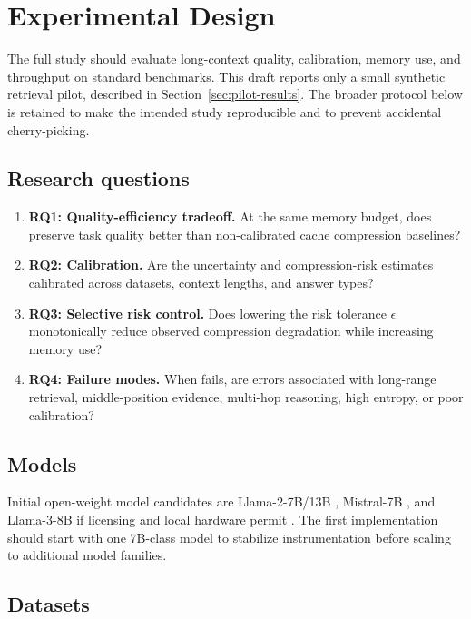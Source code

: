\section{Experimental Design}

The full study should evaluate long-context quality, calibration, memory use, and throughput on standard benchmarks. This draft reports only a small synthetic retrieval pilot, described in Section~\ref{sec:pilot-results}. The broader protocol below is retained to make the intended study reproducible and to prevent accidental cherry-picking.

\subsection{Research questions}

\begin{enumerate}[leftmargin=*]
    \item \textbf{RQ1: Quality-efficiency tradeoff.} At the same memory budget, does \uckv{} preserve task quality better than non-calibrated cache compression baselines?
    \item \textbf{RQ2: Calibration.} Are the uncertainty and compression-risk estimates calibrated across datasets, context lengths, and answer types?
    \item \textbf{RQ3: Selective risk control.} Does lowering the risk tolerance $\epsilon$ monotonically reduce observed compression degradation while increasing memory use?
    \item \textbf{RQ4: Failure modes.} When \uckv{} fails, are errors associated with long-range retrieval, middle-position evidence, multi-hop reasoning, high entropy, or poor calibration?
\end{enumerate}

\subsection{Models}

Initial open-weight model candidates are Llama-2-7B/13B \citep{touvron2023llama}, Mistral-7B \citep{jiang2023mistral}, and Llama-3-8B if licensing and local hardware permit \citep{grattafiori2024llama}. The first implementation should start with one 7B-class model to stabilize instrumentation before scaling to additional model families.

\subsection{Datasets}

